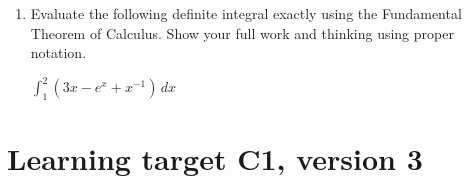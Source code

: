 \begin{enumerate}[leftmargin=0pt]
\begin{center}
\begin{minipage}{0.55\linewidth}
\begin{enumerate}
        \vspace{2em} 

        Then, find $N'(3)$.
        
        \vspace{3em}
        \item[(ii.)] If $R(x) = h(x)^4$, find $R'(x)$.

        \vspace{2em} 
        
        Then, find $R'(-2)$.
        \vspace{3em}
      \end{enumerate}

\end{minipage}
\end{center}



		\item Evaluate the following definite integral exactly using the Fundamental Theorem of Calculus.  Show your full work and thinking using proper notation.
		
		$\displaystyle \int_{1}^{2} \left(3x - e^x + x^{-1} \right) \, dx$
\end{enumerate}
\pagebreak
\section{Learning target C1, version 3}


